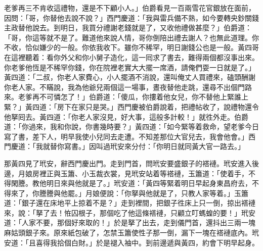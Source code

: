 老爹再三不肯收這禮物，還是不下顧小人。」伯爵看見一百兩雪花官銀放在面前，因問：「哥，你替他去說不說？」西門慶道：「我與雷兵備不熟，如今要轉央鈔關錢主政替他說去。到明日，我買分禮謝老錢就是了，又收他禮做甚麼？」伯爵道：「哥，你這等就不是了。難道他來說人情，哥你倒陪出禮去謝人？也無此道理。你不收，恰似嫌少的一般。你依我收下。雖你不稀罕，明日謝錢公也是一般。黃四哥在這裡聽着：看你外父和你小舅子造化，這一囘求了書去，難得兩個都沒事出來。你老爹他恆是不稀罕你錢，你在院裡老實大大擺一席酒，請俺們耍一日就是了。」{}黃四道：「二叔，你老人家費心，小人擺酒不消說，還叫俺丈人買禮來，磕頭酬謝你老人家。不瞞說，我為他爺兒兩個這一場事，晝夜替他走跳，還尋不出個門路來。老爹再不可憐怎了！」伯爵道：「傻瓜，你摟着他女兒，你不替他上緊誰上緊？」{}黃四道：「房下在家只是哭。」西門慶被伯爵說着，把禮帖收了，說禮物還令他拏囘去。{}黃四道：「你老人家沒見，好大事，這般多計較！」就徃外走。伯爵道：「你過來，我和你說，你書幾時要？」黃四道：「如今緊等着救命，望老爹今日寫了書，差下人，明早我使小兒同去走遭。不知差那位大官兒去，我會他會。」西門慶道：「我就替你寫書。」因叫過玳安來分付：「你明日就同黃大官一路去。」

那黃四見了玳安，辭西門慶出門。走到門首，問玳安要盛銀子的褡褳。玳安進入後邊，月娘房裡正與玉簫、小玉裁衣裳，見玳安站着等褡褳，玉簫道：「使着手，不得閑謄。教他明日來與他就是了。」玳安道：「黃四等緊着明日早起身東昌府去，不得來了，你謄謄與他罷。」月娘便說：「你拏與他就是了，只教人家等着。」玉簫道：「銀子還在床地平上掠着不是？」走到裡間，把銀子徃床上只一倒，掠出褡褳來，說：「拏了去！恠囚根子，那個吃了他這條褡褳，只顧立叮螞蝗的要！」玳安道：「人家不要，那個好來取的！」於是拏了出去，走到儀門首，還抖出三兩一塊麻姑頭銀子來。{}原來紙包破了，怎禁玉簫使性子那一倒，漏下一塊在褡褳底內。玳安道：「且喜得我拾個白財。」於是褪入袖中。{}到前邊遞與黃四，約會下明早起身。

